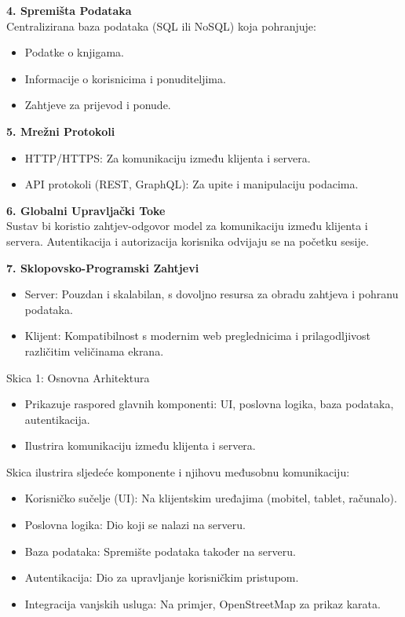     \textbf{4. Spremišta Podataka}\\

        Centralizirana baza podataka (SQL ili NoSQL) koja pohranjuje:
        \begin{itemize}
		  \item {Podatke o knjigama.}
		  \item {Informacije o korisnicima i ponuditeljima.}
		  \item {Zahtjeve za prijevod i ponude.}				
	   \end{itemize}

    \textbf{5. Mrežni Protokoli}\\
    
    \begin{itemize}
		  \item {HTTP/HTTPS: Za komunikaciju između klijenta i servera.}
		  \item {API protokoli (REST, GraphQL): Za upite i manipulaciju podacima.}
	   \end{itemize}

    \textbf{6. Globalni Upravljački Toke}\\

        Sustav bi koristio zahtjev-odgovor model za komunikaciju između klijenta i servera. Autentikacija i autorizacija korisnika odvijaju se na početku sesije.
    
    \textbf{7. Sklopovsko-Programski Zahtjevi}\\

    \begin{itemize}
		  \item {Server: Pouzdan i skalabilan, s dovoljno resursa za obradu zahtjeva i pohranu podataka.}
		  \item {Klijent: Kompatibilnost s modernim web preglednicima i prilagodljivost različitim veličinama ekrana.}			
	   \end{itemize}
	
		

		Skica 1: Osnovna Arhitektura

    \begin{itemize}
		  \item {Prikazuje raspored glavnih komponenti: UI, poslovna logika, baza podataka, autentikacija.}
		  \item {Ilustrira komunikaciju između klijenta i servera.}			
	   \end{itemize}
	
  Skica ilustrira sljedeće komponente i njihovu međusobnu komunikaciju:
   \begin{itemize}
		  \item {Korisničko sučelje (UI): Na klijentskim uređajima (mobitel, tablet, računalo).}
		  \item {Poslovna logika: Dio koji se nalazi na serveru.}	
            \item {Baza podataka: Spremište podataka također na serveru.}
		  \item {Autentikacija: Dio za upravljanje korisničkim pristupom.}	
            \item {Integracija vanjskih usluga: Na primjer, OpenStreetMap za prikaz karata.}
	   \end{itemize}

